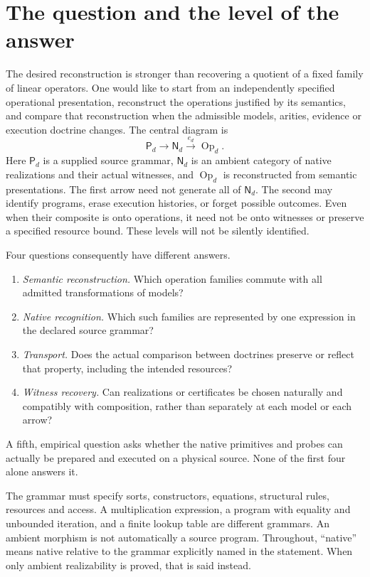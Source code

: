 \documentclass[11pt]{article}
\theoremstyle{definition}
\theoremstyle{remark}
\newcommand{\Op}{\operatorname{Op}}
\begin{document}
\section{The question and the level of the answer}

The desired reconstruction is stronger than recovering a quotient of a fixed
family of linear operators. One would like to start from an independently
specified operational presentation, reconstruct the operations justified by
its semantics, and compare that reconstruction when the admissible models,
arities, evidence or execution doctrine changes. The central diagram is
\[
  \mathsf P_d\longrightarrow\mathsf N_d
       \xrightarrow{e_d}\Op_d.
\]
Here $\mathsf P_d$ is a supplied source grammar, $\mathsf N_d$ is an
ambient category of native realizations and their actual witnesses, and
$\Op_d$ is reconstructed from semantic presentations. The first arrow
need not generate all of $\mathsf N_d$. The second may identify programs,
erase execution histories, or forget possible outcomes. Even when their
composite is onto operations, it need not be onto witnesses or preserve a
specified resource bound. These levels will not be silently identified.

Four questions consequently have different answers.
\begin{enumerate}
\item \emph{Semantic reconstruction.} Which operation families commute
with all admitted transformations of models?
\item \emph{Native recognition.} Which such families are represented by
one expression in the declared source grammar?
\item \emph{Transport.} Does the actual comparison between doctrines
preserve or reflect that property, including the intended resources?
\item \emph{Witness recovery.} Can realizations or certificates be chosen
naturally and compatibly with composition, rather than separately at each
model or each arrow?
\end{enumerate}
A fifth, empirical question asks whether the native primitives and probes
can actually be prepared and executed on a physical source. None of the
first four alone answers it.

The grammar must specify sorts, constructors, equations, structural rules,
resources and access. A multiplication expression, a program with equality
and unbounded iteration, and a finite lookup table are different grammars.
An ambient morphism is not automatically a source program. Throughout,
``native'' means native relative to the grammar explicitly named in the
statement. When only ambient realizability is proved, that is said instead.
\end{document}
